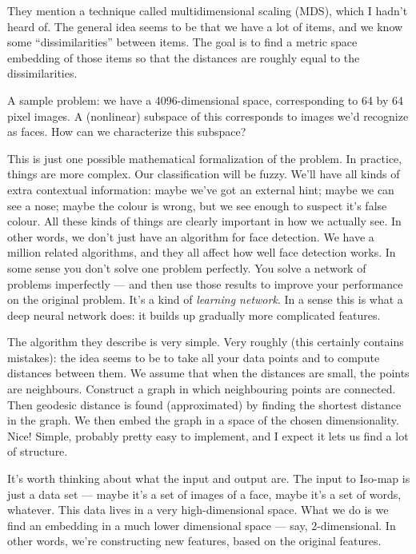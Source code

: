 \documentclass[12pt]{article}
\begin{document}
They mention a technique called multidimensional scaling (MDS), which
I hadn't heard of.  The general idea seems to be that we have a lot of
items, and we know some ``dissimilarities'' between items.  The goal
is to find a metric space embedding of those items so that the
distances are roughly equal to the dissimilarities.

A sample problem: we have a 4096-dimensional space, corresponding to
64 by 64 pixel images.  A (nonlinear) subspace of this corresponds to
images we'd recognize as faces.  How can we characterize this
subspace?  

This is just one possible mathematical formalization of the problem.
In practice, things are more complex.  Our classification will be
fuzzy.  We'll have all kinds of extra contextual information: maybe
we've got an external hint; maybe we can see a nose; maybe the colour
is wrong, but we see enough to suspect it's false colour.  All these
kinds of things are clearly important in how we actually see.  In
other words, we don't just have an algorithm for face detection.  We
have a million related algorithms, and they all affect how well face
detection works.  In some sense you don't solve one problem perfectly.
You solve a network of problems imperfectly --- and then use those
results to improve your performance on the original problem.  It's a
kind of \emph{learning network}.  In a sense this is what a deep
neural network does: it builds up gradually more complicated features.

The algorithm they describe is very simple.  Very roughly (this
certainly contains mistakes): the idea seems to be to take all your
data points and to compute distances between them.  We assume that
when the distances are small, the points are neighbours.  Construct a
graph in which neighbouring points are connected.  Then geodesic
distance is found (approximated) by finding the shortest distance in
the graph.  We then embed the graph in a space of the chosen
dimensionality.  Nice!  Simple, probably pretty easy to implement, and
I expect it lets us find a lot of structure.

It's worth thinking about what the input and output are.  The input to
Iso-map is just a data set --- maybe it's a set of images of a face,
maybe it's a set of words, whatever.  This data lives in a very
high-dimensional space.  What we do is we find an embedding in a much
lower dimensional space --- say, 2-dimensional.  In other words, we're
constructing new features, based on the original features.
\end{document}
